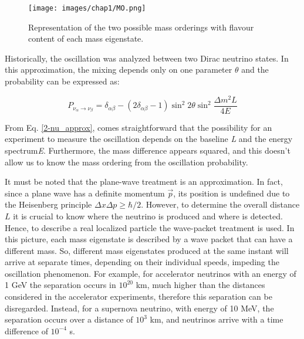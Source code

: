 \begin{figure}
    \centering
    \texttt{[image: images/chap1/MO.png]}
    \caption{Representation of the two possible mass orderings with flavour content of each mass eigenstate.}
    \label{fig:MO}
\end{figure}

Historically, the oscillation was analyzed between two Dirac neutrino states. In this approximation, the mixing depends only on one parameter $\theta$ and the probability can be expressed as: 

\begin{equation}
\label{2-nu_approx}
    P_{\nu_{\alpha} \rightarrow \nu_{\beta}} = \delta_{\alpha\beta} - (2\delta_{\alpha\beta} - 1)\sin^2{2\theta}\sin^2{\frac{\Delta m^2 L}{4E}}
\end{equation}

From Eq. \ref{2-nu_approx}, comes straightforward that the possibility for an experiment to measure the oscillation depends on the baseline \textit{L} and the energy spectrum\textit{E}.
Furthermore, the mass difference appears squared, and this doesn't allow us to know the mass ordering from the oscillation probability. 

It must be noted that the plane-wave treatment is an approximation. In fact, since a plane wave has a definite momentum $\Vec{p}$, its position is undefined due to the Heisenberg principle $\Delta x \Delta p \geq \hbar/2$. However, to determine the overall distance $L$ it is crucial to know where the neutrino is produced and where is detected. Hence, to describe a real localized particle the wave-packet treatment is used. In this picture, each mass eigenstate is described by a wave packet that can have a different mass. So, different mass eigenstates produced at the same instant will arrive at separate times, depending on their individual speeds, impeding the oscillation phenomenon.  For example, for accelerator neutrinos with an energy of 1 GeV the separation occurs in $10^{20}$ km, much higher than the distances considered in the accelerator experiments, therefore this separation can be disregarded. Instead, for a supernova neutrino, with energy of 10 MeV, the separation occurs over a distance of $10^3$ km, and neutrinos arrive with a time difference of $10^{-4}$ s.


